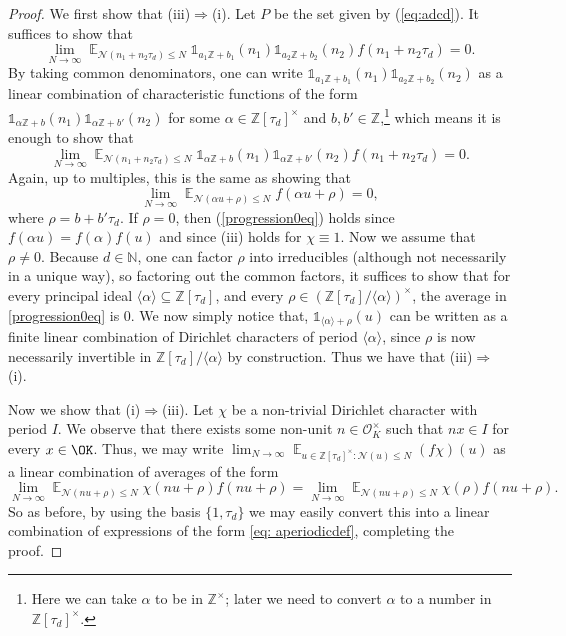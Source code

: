 \documentclass[11pt]{amsart}
\theoremstyle{definition}
\DeclareMathOperator*{\E}{\mathbb{E}}
\newcommand{\N}{{\mathbb N}}
\newcommand{\NN}{{\mathcal N}}
\newcommand{\Z}{{\mathbb Z}}
\begin{document}
\begin{proof}


We first show that (iii)$\Rightarrow$(i).
Let $P$ be the set given by (\ref{eq:adcd}). 
It suffices to show that
\[
\lim_{N\to\infty}\E_{\NN(n_1+n_2\tau_{d}) \leq N}\mathds{1}_{a_{1}\Z+b_{1}}(n_1)\mathds{1}_{a_{2}\Z+b_{2}}(n_2)f(n_1+n_2\tau_{d})=0.
\]
By taking common denominators, one can write $\mathds{1}_{a_{1}\Z+b_{1}}(n_1)\mathds{1}_{a_{2}\Z+b_{2}}(n_2)$ as a linear combination of characteristic functions of the form $\mathds{1}_{\alpha\Z+b}(n_1)\mathds{1}_{\alpha\Z+b'}(n_2)$ for some $\alpha\in\Z[\tau_{d}]^{\times}$ and $b, b'\in\Z$,\footnote{Here we can take $\alpha$ to be in $\Z^{\times}$; later we need to convert $\alpha$ to a number in $\Z[\tau_{d}]^{\times}.$} which means it is enough to show that
\[
\lim_{N\to\infty}\E_{\NN(n_1+n_2\tau_{d}) \leq N}\mathds{1}_{\alpha\Z+b}(n_1)\mathds{1}_{\alpha\Z+b'}(n_2)f(n_1+n_2\tau_{d})=0.
\]
Again, up to multiples, this is the same as showing that
\begin{equation}\label{progression0eq}
\lim_{N\to\infty}\E_{\NN(\alpha u+\rho) \leq N} f(\alpha u+\rho)=0,
\end{equation}
 where $\rho=b+b'\tau_{d}$.
 If $\rho=0$, then (\ref{progression0eq}) holds since $f(\alpha u)=f(\alpha)f(u)$ and since (iii) holds for $\chi\equiv 1$. Now we assume that $\rho\neq 0$.
 Because $d\in\N$, one can factor $\rho$ into irreducibles (although not necessarily in a unique way), so factoring out the common factors, it suffices to show that for every principal ideal $\langle \alpha\rangle \subseteq \Z[\tau_{d}]$, and every $\rho \in (\Z[\tau_{d}]/\langle \alpha \rangle)^{\times}$, the average in \eqref{progression0eq} is 0. We now simply notice that, $\mathds{1}_{\langle \alpha \rangle +\rho}(u)$ can be written as a finite linear combination of Dirichlet characters of period $\langle \alpha\rangle$, since $\rho$ is now necessarily invertible in $\Z[\tau_{d}]/\langle\alpha\rangle$ by construction. Thus we have that (iii)$\Rightarrow$(i).

Now we show that (i)$\Rightarrow$(iii).
 Let $\chi$ be a non-trivial Dirichlet character with period $I$. We observe that   there exists some non-unit $n \in \mathcal{O}_K^{\times}$   such that $nx \in I$ for every $x \in \OK$. Thus, we may write $\lim_{N\to\infty}\E_{u\in\Z[\tau_{d}]^{\times}\colon \NN(u)\leq N}(f\chi)(u)$ as a linear combination of averages of the form
\[
\lim_{N \to \infty} \E_{\NN(nu+\rho) \leq N} \chi(nu+\rho)f(nu+\rho)=\lim_{N \to \infty} \E_{\NN(nu+\rho) \leq N} \chi(\rho)f(nu+\rho).
\]
So as before, by using the basis $\{1,\tau_{d}\}$ we may easily convert this  into a linear combination of expressions of the form \eqref{eq: aperiodicdef}, completing the proof.
%
\iffalse




\end{proof}
\end{document}
